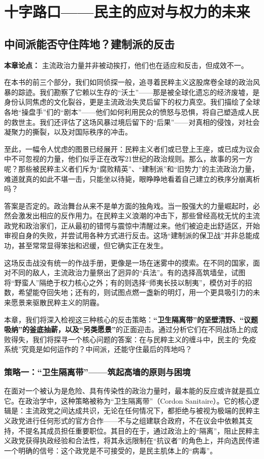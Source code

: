 \part{十字路口——民主的应对与权力的未来}
\chapter{中间派能否守住阵地？建制派的反击}

\textbf{本章论点：} 主流政治力量并非被动挨打，他们也在适应和反击，但成效不一。

在本书的前三个部分，我们如同侦探一般，追寻着民粹主义这股席卷全球的政治风暴的踪迹。我们勘察了它赖以生存的“沃土”——那是被全球化遗忘的经济废墟，是身份认同焦虑的文化裂谷，更是主流政治失灵后留下的权力真空。我们描绘了全球各地“操盘手”们的“剧本”——他们如何利用民众的愤怒与恐惧，将自己塑造成人民的救世主。我们还评估了这场风暴过境后留下的“后果”——对真相的侵蚀，对社会凝聚力的撕裂，以及对国际秩序的冲击。

至此，一幅令人忧虑的图景已经展开：民粹主义者们或已登上王座，或已成为议会中不可忽视的力量，他们似乎正在改写21世纪的政治规则。那么，故事的另一方呢？那些被民粹主义者们斥为“腐败精英”、“建制派”和“旧势力”的主流政治力量，难道就真的如此不堪一击，只能坐以待毙，眼睁睁地看着自己建立的秩序分崩离析吗？

答案是否定的。政治舞台从来不是单方面的独角戏。当一股强大的力量崛起时，必然会激发出相应的反作用力。在民粹主义浪潮的冲击下，那些曾经高枕无忧的主流政党和政治家们，正从最初的错愕与震惊中清醒过来。他们被迫走出舒适区，开始审视自身的失败，并尝试用各种方式进行反击。这场“建制派的保卫战”并非总能成功，甚至常常显得笨拙和迟缓，但它确实正在发生。

这场反击战没有统一的作战手册，更像是一场在迷雾中的摸索。在不同的国家，面对不同的敌人，主流政治力量祭出了迥异的“兵法”。有的选择高筑墙垒，试图将“野蛮人”隔绝于权力核心之外；有的则选择“师夷长技以制夷”，模仿对手的招数，希望能夺回失地；还有的，则试图点燃一盏新的明灯，用一个更具吸引力的未来愿景来驱散民粹主义的阴霾。

本章，我们将深入检视这三种核心的反击策略：\textbf{“卫生隔离带”的坚壁清野、“议题吸纳”的釜底抽薪，以及“另类愿景”}的正面迎击。通过分析它们在不同战场上的成败得失，我们将探寻一个核心问题的答案：在与民粹主义的缠斗中，民主的“免疫系统”究竟是如何运作的？中间派，还能守住最后的阵地吗？

\section{策略一：“卫生隔离带”——筑起高墙的原则与困境}
在面对一个被认为是危险、具有传染性的政治力量时，最本能的反应或许就是孤立它。在政治学中，这种策略被称为“卫生隔离带”（Cordon Sanitaire）。它的核心逻辑是：主流政党之间达成共识，无论在任何情况下，都拒绝与被视为极端的民粹主义政党进行任何形式的官方合作——不与之组建联合政府，不在议会中依赖其支持，不提名其成员担任重要职位。其目的在于，通过政治上的“隔离”，阻止民粹主义政党获得执政经验和合法性，将其永远限制在“抗议者”的角色上，并向选民传递一个明确的信号：这个政党是不可接受的，是民主肌体上的“病毒”。

